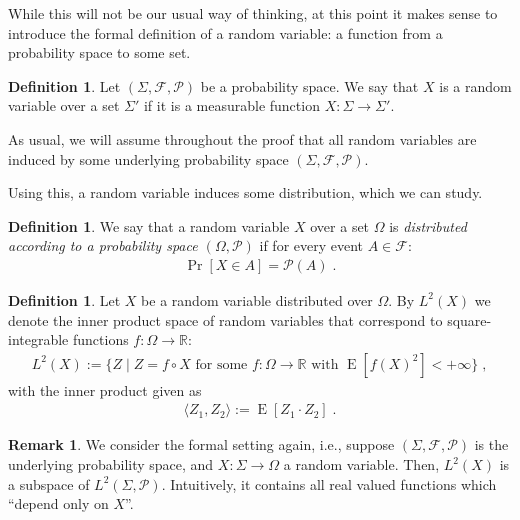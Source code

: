 \documentclass{daj}
\newcommand{\1}{\mathbbm{1}}
\theoremstyle{plain}
\theoremstyle{definition}
\newtheorem{definition}[theorem]{Definition}
\newtheorem{remark}[theorem]{Remark}
\DeclareMathOperator*{\EE}{E}
\begin{document}
While this will not be our usual way of thinking,
at this point it makes sense to introduce the formal
definition of a random variable: a function from a probability
space to some set.
\begin{definition}
Let $(\Sigma, \mathcal{F}, \mathcal{P})$ be a probability space. 
We say that $X$ is a random variable over
a set  $\Sigma'$
if it is a measurable function $X: \Sigma \to \Sigma'$.
\end{definition}
As usual, we will assume throughout the
proof that all random variables are induced by some underlying probability 
space $(\Sigma,\mathcal{F},\mathcal{P})$.


Using this,
a random variable induces some distribution, which we can study.

\begin{definition}
We say that a random variable $X$ over a set $\Omega$ is \emph{distributed
according to a probability space $(\Omega, \mathcal{P})$} 
if for every event $A \in \mathcal{F}$:
\begin{align*}
  \Pr[X \in A] = \mathcal{P}(A) \; .
\end{align*}
\end{definition}

\begin{definition}
\label{def:l2-rv}
Let $X$ be a random variable distributed over $\Omega$.
By $L^2(X)$ we denote the inner product space of random variables that
correspond to square-integrable functions $f: \Omega \to \mathbb{R}$:
\begin{align*}
  L^2(X) := \{ Z \mid Z = f \circ X \text{ for some } f:\Omega \to \mathbb{R}  
  \text{ with } \EE[f(X)^2] < +\infty  \} \; ,
\end{align*}
with the inner product given as
\begin{align*}
  \langle Z_1, Z_2 \rangle := \EE[ Z_1 \cdot Z_2 ] \; .
\end{align*}
\end{definition}

\begin{remark}
We consider the formal setting again, i.e., 
suppose $(\Sigma, \mathcal{F}, \mathcal{P})$ is the underlying probability 
space, and $X: \Sigma \to \Omega$ a random variable. 
Then, $L^{2}(X)$ is a subspace of $L^2(\Sigma,\mathcal{P})$.
Intuitively, it contains all real valued functions 
which ``depend only on $X$''.
\end{remark}
\end{document}
